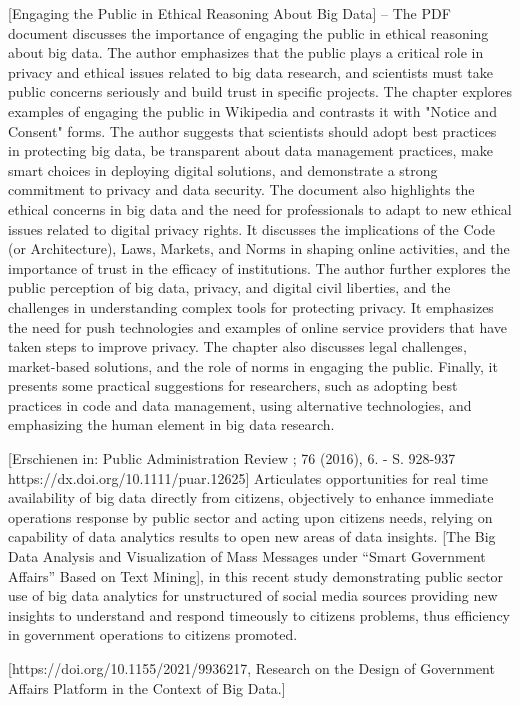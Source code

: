 [Engaging the Public in Ethical Reasoning About Big Data]  -- The PDF document discusses the importance of engaging the public in ethical reasoning about big data. The author emphasizes that the public plays a critical role in privacy and ethical issues related to big data research, and scientists must take public concerns seriously and build trust in specific projects. The chapter explores examples of engaging the public in Wikipedia and contrasts it with "Notice and Consent" forms. The author suggests that scientists should adopt best practices in protecting big data, be transparent about data management practices, make smart choices in deploying digital solutions, and demonstrate a strong commitment to privacy and data security. The document also highlights the ethical concerns in big data and the need for professionals to adapt to new ethical issues related to digital privacy rights. It discusses the implications of the Code (or Architecture), Laws, Markets, and Norms in shaping online activities, and the importance of trust in the efficacy of institutions. The author further explores the public perception of big data, privacy, and digital civil liberties, and the challenges in understanding complex tools for protecting privacy. It emphasizes the need for push technologies and examples of online service providers that have taken steps to improve privacy. The chapter also discusses legal challenges, market-based solutions, and the role of norms in engaging the public. Finally, it presents some practical suggestions for researchers, such as adopting best practices in code and data management, using alternative technologies, and emphasizing the human element in big data research.

[Erschienen in: Public Administration Review ; 76 (2016), 6. - S. 928-937 https://dx.doi.org/10.1111/puar.12625]
Articulates opportunities for real time availability of big data directly from citizens, objectively to enhance immediate operations response by public sector and acting upon citizens needs, relying on capability of data analytics results to open new areas of data insights.  [The Big Data Analysis and Visualization of Mass Messages under “Smart Government Affairs” Based on Text Mining], in this recent study demonstrating public sector use of big data analytics for unstructured of social media sources providing new insights to understand and respond timeously to citizens problems, thus efficiency in government operations to citizens promoted.

[https://doi.org/10.1155/2021/9936217, Research on the Design of Government Affairs Platform in the Context of Big Data.]

